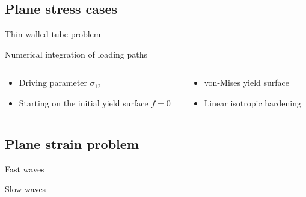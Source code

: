 \subsection{Plane stress cases}
\begin{frame}{Thin-walled tube problem}
  \begin{footnotesize}
    \begin{block}{Numerical integration of loading paths}
      \begin{columns}
        \begin{column}{0.5\textwidth}
          \begin{itemize}
          \item Driving parameter $\sigma_{12}$
          \item Starting on the initial yield surface $f=0$
          \end{itemize}
        \end{column}
        \begin{column}{0.5\textwidth}
          \begin{itemize}
          \item von-Mises yield surface
          \item Linear isotropic hardening
          \end{itemize}
        \end{column}
      \end{columns}
    \end{block}  
  \end{footnotesize}
  \vspace{-0.25cm}
  \begin{block}{}
    \centering
      
  \end{block}
\end{frame}


\subsection{Plane strain problem}
\begin{frame}%
  \begin{block}{Fast waves}
    \vspace{-0.5cm}
    \centering
    
  \end{block}
  \begin{block}{Slow waves}
    \vspace{-0.5cm}
    \centering
    
  \end{block}

   
\end{frame}

